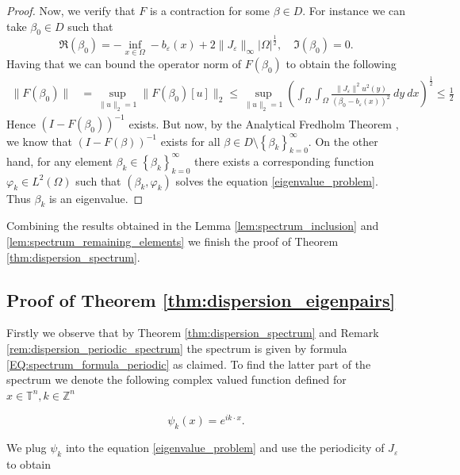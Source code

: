 \documentclass[12pt, a4paper]{article}
\theoremstyle{break}
\theoremstyle{break}
\theoremstyle{break}
\theoremstyle{break}
\theoremstyle{break}
\newcommand{\Seq}[2]{\left\{#1_#2\right\}_{#2 = 0}^\infty}
\newcommand{\Leb}{L^2\left(\Omega\right)}
\begin{document}
\begin{proof}
    Now, we verify that $F$ is a contraction for some $\beta \in D$. For instance we can take $\beta_0 \in D$ such that  
    $$\Re(\beta_0) = - \inf_{x \in \Omega} - b_\varepsilon(x) + 2 \|J_\varepsilon\|_\infty |\Omega|^\frac{1}{2}, \quad \Im(\beta_0) = 0.$$ 
    Having that we can bound the operator norm of $F(\beta_0)$ to obtain the following
    \begin{align*}
        \| F(\beta_0) \| &= \sup_{\|u\|_2=1} \|F(\beta_0)[u]\|_2 \leq \sup_{\|u\|_2 = 1} \left( \int_\Omega \int_\Omega \frac{\|J_\varepsilon\|^2 u^2(y)}{(\beta_0 - b_\varepsilon(x))^2}\:dy\:dx \right)^\frac{1}{2} \leq \frac{1}{2}
    \end{align*}
    Hence $(I - F(\beta_0))^{-1}$ exists. But now, by the Analytical Fredholm Theorem \cite{ReedSimon}, we know that $(I - F(\beta))^{-1}$ exists for all $\beta \in D \setminus \Seq{\beta}{k}$. On the other hand, for any element $\beta_k \in \Seq{\beta}{k}$ there exists a corresponding function $\varphi_k \in \Leb$ such that $(\beta_k, \varphi_k)$ solves the equation \eqref{eigenvalue_problem}. Thus $\beta_k$ is an eigenvalue.
\end{proof}
Combining the results obtained in the Lemma \ref{lem:spectrum_inclusion} and \ref{lem:spectrum_remaining_elements} we finish the proof of Theorem \ref{thm:dispersion_spectrum}.

\subsection{Proof of Theorem \ref{thm:dispersion_eigenpairs}}

Firstly we observe that by Theorem \ref{thm:dispersion_spectrum} and Remark \ref{rem:dispersion_periodic_spectrum} the spectrum is given by formula \eqref{EQ:spectrum_formula_periodic} as claimed. To find the latter part of the spectrum we denote the following complex valued function defined for $x \in \mathbb{T}^n, k \in \mathbb{Z}^n$

\begin{equation*}
    \psi_k(x) = e^{ik\cdot x}.
\end{equation*}

We plug $\psi_k$ into the equation \eqref{eigenvalue_problem} and use the periodicity of $J_\varepsilon$ to obtain
\end{document}
